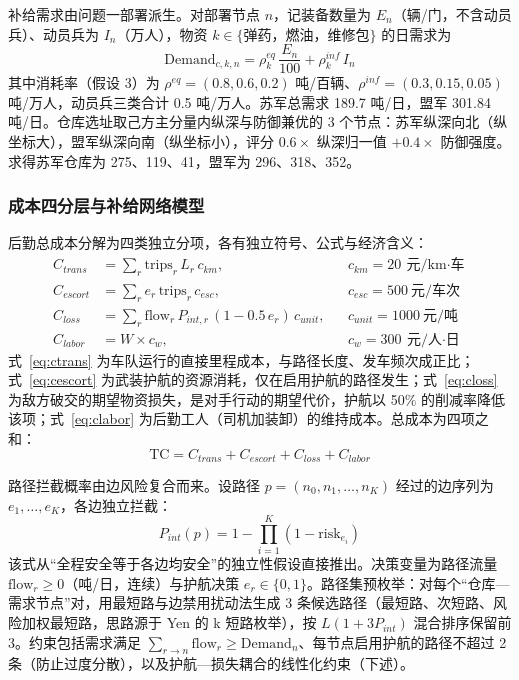 \documentclass[12pt,a4paper]{ctexart}
\begin{document}
补给需求由问题一部署派生。对部署节点 $n$，记装备数量为 $E_n$（辆/门，不含动员兵）、动员兵为 $I_n$（万人），物资 $k\in\{$弹药，燃油，维修包$\}$ 的日需求为
\begin{equation}
\mathrm{Demand}_{c,k,n}=\rho^{eq}_k\,\frac{E_n}{100}+\rho^{inf}_k\,I_n
\label{eq:demand}
\end{equation}
其中消耗率（假设 3）为 $\rho^{eq}=(0.8,0.6,0.2)$ 吨/百辆、$\rho^{inf}=(0.3,0.15,0.05)$ 吨/万人，动员兵三类合计 0.5 吨/万人。苏军总需求 189.7 吨/日，盟军 301.84 吨/日。仓库选址取己方主分量内纵深与防御兼优的 3 个节点：苏军纵深向北（纵坐标大），盟军纵深向南（纵坐标小），评分 $0.6\times$ 纵深归一值 $+0.4\times$ 防御强度。求得苏军仓库为 275、119、41，盟军为 296、318、352。

\subsubsection{成本四分层与补给网络模型}

后勤总成本分解为四类独立分项，各有独立符号、公式与经济含义：
\begin{align}
C_{trans}&=\sum_r \mathrm{trips}_r\,L_r\,c_{km}, && c_{km}=20\ \text{元/km$\cdot$车} \label{eq:ctrans}\\
C_{escort}&=\sum_r e_r\,\mathrm{trips}_r\,c_{esc}, && c_{esc}=500\ \text{元/车次} \label{eq:cescort}\\
C_{loss}&=\sum_r \mathrm{flow}_r\,P_{int,r}\,(1-0.5\,e_r)\,c_{unit}, && c_{unit}=1000\ \text{元/吨} \label{eq:closs}\\
C_{labor}&=W\times c_w, && c_w=300\ \text{元/人$\cdot$日} \label{eq:clabor}
\end{align}
式~\eqref{eq:ctrans} 为车队运行的直接里程成本，与路径长度、发车频次成正比；式~\eqref{eq:cescort} 为武装护航的资源消耗，仅在启用护航的路径发生；式~\eqref{eq:closs} 为敌方破交的期望物资损失，是对手行动的期望代价，护航以 50\% 的削减率降低该项；式~\eqref{eq:clabor} 为后勤工人（司机加装卸）的维持成本。总成本为四项之和：
\begin{equation}
\mathrm{TC}=C_{trans}+C_{escort}+C_{loss}+C_{labor}
\label{eq:tc}
\end{equation}

路径拦截概率由边风险复合而来。设路径 $p=(n_0,n_1,\dots,n_K)$ 经过的边序列为 $e_1,\dots,e_K$，各边独立拦截：
\begin{equation}
P_{int}(p)=1-\prod_{i=1}^{K}(1-\mathrm{risk}_{e_i})
\label{eq:pathrisk}
\end{equation}
该式从“全程安全等于各边均安全”的独立性假设直接推出。决策变量为路径流量 $\mathrm{flow}_r\ge 0$（吨/日，连续）与护航决策 $e_r\in\{0,1\}$。路径集预枚举：对每个“仓库—需求节点”对，用最短路与边禁用扰动法生成 3 条候选路径（最短路、次短路、风险加权最短路，思路源于 Yen 的 k 短路枚举\cite{ref6}），按 $L(1+3P_{int})$ 混合排序保留前 3。约束包括需求满足 $\sum_{r\to n}\mathrm{flow}_r\ge\mathrm{Demand}_n$、每节点启用护航的路径不超过 2 条（防止过度分散），以及护航—损失耦合的线性化约束（下述）。
\end{document}
